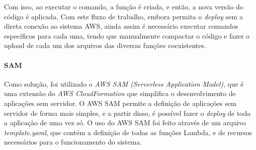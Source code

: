 Com isso, ao executar o comando, a função é criada, e então, a nova versão do código é aplicada. Com este fluxo de trabalho, embora permita o \textit{deploy} sem a direta conexão ao sistema AWS, ainda assim é necessário executar comandos específicos para cada uma, tendo que manualmente compactar o código e fazer o upload de cada um dos arquivos das diversas funções coexistentes.

\paragraph*{SAM}

Como solução, foi utilizado o \textit{AWS SAM (Serverless Application Model)}, que é uma extensão do \textit{AWS CloudFormation} que simplifica o desenvolvimento de aplicações sem servidor. O AWS SAM permite a definição de aplicações sem servidor de forma mais simples, e a partir disso, é possível fazer o \textit{deploy} de toda a aplicação de uma vez só. O uso do AWS SAM foi feito através de um arquivo \textit{template.yaml}, que contém a definição de todas as funções Lambda, e de recursos necessários para o funcionamento do sistema.

